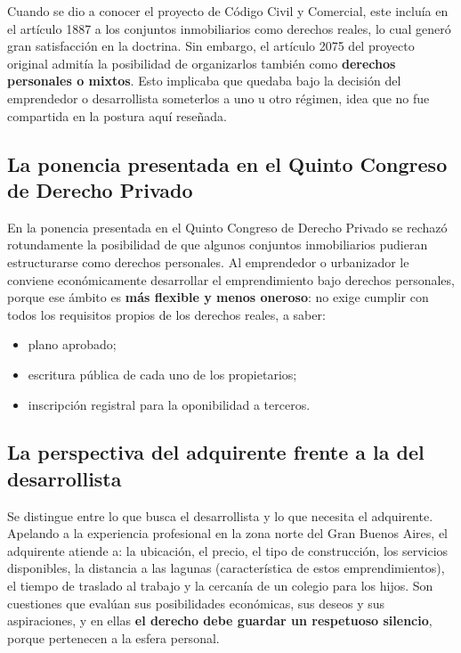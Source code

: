 \documentclass[12pt,oneside]{book}
\begin{document}
Cuando se dio a conocer el proyecto de Código Civil y Comercial, este incluía en el artículo 1887 a los conjuntos inmobiliarios como derechos reales, lo cual generó gran satisfacción en la doctrina. Sin embargo, el artículo 2075 del proyecto original admitía la posibilidad de organizarlos también como \textbf{derechos personales o mixtos}. Esto implicaba que quedaba bajo la decisión del emprendedor o desarrollista someterlos a uno u otro régimen, idea que no fue compartida en la postura aquí reseñada.

\subsection{La ponencia presentada en el Quinto Congreso de Derecho Privado}

En la ponencia presentada en el Quinto Congreso de Derecho Privado se rechazó rotundamente la posibilidad de que algunos conjuntos inmobiliarios pudieran estructurarse como derechos personales. Al emprendedor o urbanizador le conviene económicamente desarrollar el emprendimiento bajo derechos personales, porque ese ámbito es \textbf{más flexible y menos oneroso}: no exige cumplir con todos los requisitos propios de los derechos reales, a saber:

\begin{itemize}
    \item plano aprobado;
    \item escritura pública de cada uno de los propietarios;
    \item inscripción registral para la oponibilidad a terceros.
\end{itemize}

\subsection{La perspectiva del adquirente frente a la del desarrollista}

Se distingue entre lo que busca el desarrollista y lo que necesita el adquirente. Apelando a la experiencia profesional en la zona norte del Gran Buenos Aires, el adquirente atiende a: la ubicación, el precio, el tipo de construcción, los servicios disponibles, la distancia a las lagunas (característica de estos emprendimientos), el tiempo de traslado al trabajo y la cercanía de un colegio para los hijos. Son cuestiones que evalúan sus posibilidades económicas, sus deseos y sus aspiraciones, y en ellas \textbf{el derecho debe guardar un respetuoso silencio}, porque pertenecen a la esfera personal.
\end{document}
